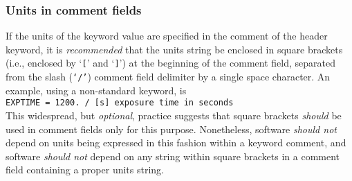 \documentclass[onecolumn]{aa}
\begin{document}
\subsubsection{Units in comment fields}
   \label{s:ucomment}

If the units of the keyword value are specified in the comment of the
header keyword, it is {\em recommended} that the units string be
enclosed in square brackets (i.e., enclosed by `{\tt [}' and `{\tt ]}') at the 
beginning of the comment field,
separated from the slash ({\tt `/'}) comment field delimiter by a
single space character.  An example, using a non-standard keyword, is\\
{\tt EXPTIME =                1200. / [s] exposure time in seconds} \\
This widespread, but {\em optional}, practice 
suggests that square brackets {\em should} be used in comment fields only
for this purpose.  Nonetheless, software {\em should not} depend on
units being expressed in this fashion within a keyword comment, and software
{\em should not} depend on any string within square brackets in a
comment field containing a proper units string. 
 
\end{document}

